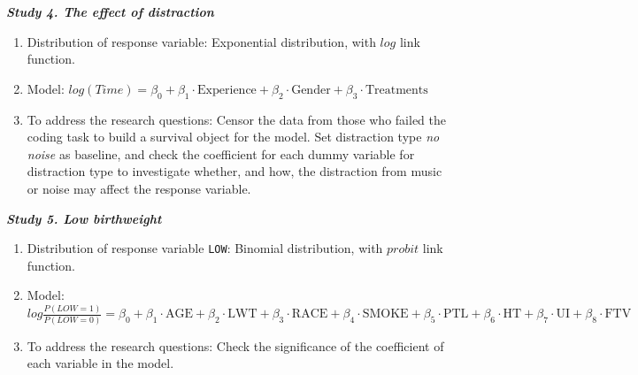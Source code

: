 \documentclass[12pt,fleqn]{article}
\theoremstyle{definition}
\begin{document}
\textbf{\textit{Study 4. The effect of distraction}}
	\begin{enumerate}
		\item Distribution of response variable: Exponential distribution, with $log$ link function.
		\item Model: $log(Time) = \beta_0 + \beta_1 \cdot \mbox{Experience} + \beta_2 \cdot \mbox{Gender} + \beta_3 \cdot \mbox{Treatments}$\\
		\item To address the research questions: Censor the data from those who failed the coding task to build a survival object for the model. Set distraction type \textit{no noise} as baseline, and check the coefficient for each dummy variable for distraction type to investigate whether, and how, the distraction from music or noise may affect the response variable.
	\end{enumerate}
\textbf{\textit{Study 5. Low birthweight}}
	\begin{enumerate}
		\item Distribution of response variable \texttt{LOW}: Binomial distribution, with $probit$ link function.
		\item Model: $log\frac{P(LOW=1)}{P(LOW=0)} = \beta_0 + \beta_1 \cdot \mbox{AGE} + \beta_2 \cdot \mbox{LWT} + \beta_3 \cdot \mbox{RACE} + \beta_4 \cdot \mbox{SMOKE} + \beta_5 \cdot \mbox{PTL} + \beta_6 \cdot \mbox{HT} + \beta_7 \cdot \mbox{UI}+ \beta_8 \cdot \mbox{FTV}$\\
		\item To address the research questions: Check the significance of the coefficient of each variable in the model.
	\end{enumerate}
\end{document}
